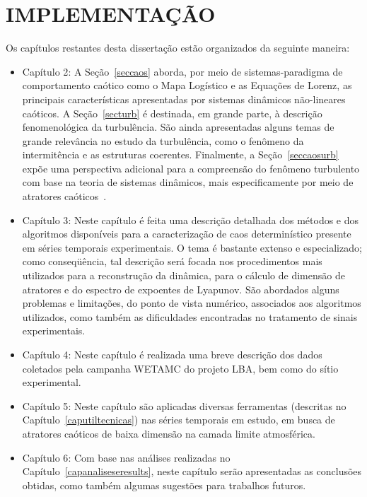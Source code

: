 
\chapter{IMPLEMENTAÇÃO}

Os capítulos restantes desta dissertação estão organizados da seguinte maneira:
\begin{itemize}
\item{Capítulo 2}: A Seção~\ref{seccaos} aborda, por meio de sistemas-paradigma de comportamento caótico como o Mapa Logístico e as Equações de Lorenz, as principais características apresentadas por sistemas dinâmicos não-lineares caóticos. A Seção~\ref{secturb} é destinada, em grande parte, à descrição fenomenológica da turbulência. São ainda apresentadas alguns temas de grande relevância no estudo da turbulência, como o fenômeno da intermitência e as estruturas coerentes. Finalmente, a Seção~\ref{seccaosurb} expõe uma perspectiva adicional para a compreensão do fenômeno turbulento com base na teoria de sistemas dinâmicos, mais especificamente por meio de atratores caóticos~\cite{ruelltak/71}.
\item{Capítulo 3}: Neste capítulo é feita uma descrição detalhada dos métodos e dos algoritmos disponíveis para a caracterização de caos determinístico presente em séries temporais experimentais. O tema é bastante extenso e especializado; como conseqüência, tal descrição será focada nos procedimentos mais utilizados para a reconstrução da dinâmica, para o cálculo de dimensão de atratores e do espectro de expoentes de Lyapunov. São abordados alguns problemas e limitações, do ponto de vista numérico, associados aos algoritmos utilizados, como também as dificuldades encontradas no tratamento de sinais experimentais. 
\item{Capítulo 4}: Neste capítulo é realizada uma breve descrição dos dados coletados pela campanha WETAMC do projeto LBA, bem como do sítio experimental.
\item{Capítulo 5}: Neste capítulo são aplicadas diversas ferramentas (descritas no Capítulo~\ref{caputiltecnicas}) nas séries temporais em estudo, em busca de atratores caóticos de baixa dimensão na camada limite atmosférica.
\item{Capítulo 6}: Com base nas análises realizadas no Capítulo~\ref{capanaliseseresults}, neste capítulo serão apresentadas as conclusões obtidas, como também algumas sugestões para trabalhos futuros.
\end{itemize}

